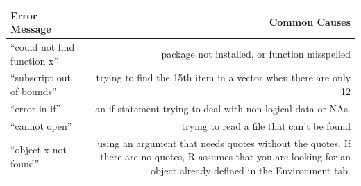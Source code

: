 \documentclass[
]{book}
\begin{document}
\begin{longtable}[]{@{}lr@{}}
\toprule
\begin{minipage}[b]{0.45\columnwidth}\raggedright
Error Message\strut
\end{minipage} & \begin{minipage}[b]{0.49\columnwidth}\raggedleft
Common Causes\strut
\end{minipage}\tabularnewline
\midrule
\endhead
\begin{minipage}[t]{0.45\columnwidth}\raggedright
``could not find function x''\strut
\end{minipage} & \begin{minipage}[t]{0.49\columnwidth}\raggedleft
package not installed, or function misspelled\strut
\end{minipage}\tabularnewline
\begin{minipage}[t]{0.45\columnwidth}\raggedright
``subscript out of bounds''\strut
\end{minipage} & \begin{minipage}[t]{0.49\columnwidth}\raggedleft
trying to find the 15th item in a vector when there are only 12\strut
\end{minipage}\tabularnewline
\begin{minipage}[t]{0.45\columnwidth}\raggedright
``error in if''\strut
\end{minipage} & \begin{minipage}[t]{0.49\columnwidth}\raggedleft
an if statement trying to deal with non-logical data or NAs.\strut
\end{minipage}\tabularnewline
\begin{minipage}[t]{0.45\columnwidth}\raggedright
``cannot open''\strut
\end{minipage} & \begin{minipage}[t]{0.49\columnwidth}\raggedleft
trying to read a file that can't be found\strut
\end{minipage}\tabularnewline
\begin{minipage}[t]{0.45\columnwidth}\raggedright
``object x not found''\strut
\end{minipage} & \begin{minipage}[t]{0.49\columnwidth}\raggedleft
using an argument that needs quotes without the quotes. If there are no quotes, R assumes that you are looking for an object already defined in the Environment tab.\strut
\end{minipage}\tabularnewline
\bottomrule
\end{longtable}
\end{document}
